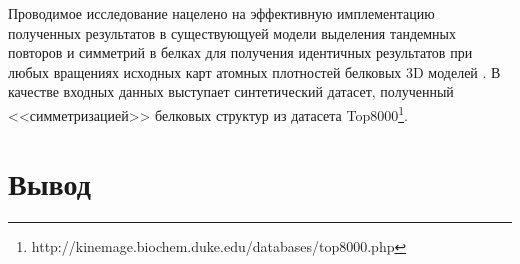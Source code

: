 \documentclass[12pt,twosides]{article}
\begin{document}
	Проводимое исследование нацелено на эффективную имплементацию полученных результатов в существующуей модели выделения тандемных повторов и симметрий в белках для получения идентичных результатов при любых вращениях исходных карт атомных плотностей белковых 3D моделей \cite{DeepSymmetry18}. В качестве входных данных выступает синтетический датасет, полученный <<симметризацией>> белковых структур из датасета Top8000\footnote{ http://kinemage.biochem.duke.edu/databases/top8000.php}. 
	 
	\section{Вывод}

	
	
	
\end{document}
